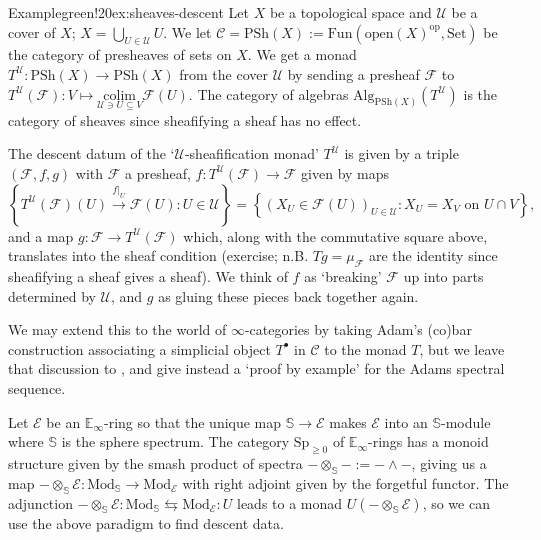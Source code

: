\begin{env}{Example}{green!20}{ex:sheaves-descent}
Let $X$ be a topological space and $\mathcal{U}$ be a cover of $X$; $X = \bigcup_{U \in \mathcal{U}} U$. We let $\mathcal{C} = \text{PSh}(X) := \text{Fun}(\text{open}(X)^\text{op},\text{Set})$ be the category of presheaves of sets on $X$. We get a monad $T^\mathcal{U} : \text{PSh}(X) \to \text{PSh}(X)$ from the cover $\mathcal{U}$ by sending a presheaf $\mathcal{F}$ to $T^\mathcal{U}(\mathcal{F}) : V \mapsto \underset{\mathcal{U} \ni U \subseteq V}{\text{colim}} \mathcal{F}(U)$. The category of algebras $\text{Alg}_{\text{PSh}(X)}(T^\mathcal{U})$ is the category of sheaves since sheafifying a sheaf has no effect.

The descent datum of the `$\mathcal{U}$-sheafification monad' $T^\mathcal{U}$ is given by a triple $(\mathcal{F}, f, g)$ with $\mathcal{F}$ a presheaf, $f : T^\mathcal{U}(\mathcal{F}) \to \mathcal{F}$ given by maps
	\[
	\left\{
	T^\mathcal{U}(\mathcal{F})(U)
	\overset{f|_U}{\to}
	\mathcal{F}(U)
	: U \in \mathcal{U}
	\right\}
	=
	\left\{
	(X_U \in \mathcal{F}(U))_{U\in\mathcal{U}}
	: X_U = X_V \text{ on } U \cap V
	\right\},
	\]
and a map $g : \mathcal{F} \to T^\mathcal{U}(\mathcal{F})$ which, along with the commutative square above, translates into the sheaf condition (exercise; n.B. $Tg = \mu_\mathcal{F}$ are the identity since sheafifying a sheaf gives a sheaf). We think of $f$ as `breaking' $\mathcal{F}$ up into parts determined by $\mathcal{U}$, and $g$ as gluing these pieces back together again.
\end{env}

We may extend this to the world of $\infty$-categories by taking Adam's (co)bar construction associating a simplicial object $T^\bullet$ in $\mathcal{C}$ to the monad $T$, but we leave that discussion to \cite{Hess18}, and give instead a `proof by example' for the Adams spectral sequence.



\newpage
Let $\mathcal{E}$ be an $\mathbb{E}_\infty$-ring so that the unique map $\mathbb{S} \to \mathcal{E}$ makes $\mathcal{E}$ into an $\mathbb{S}$-module where $\mathbb{S}$ is the sphere spectrum. The category $\text{Sp}_{\geq0}$ of $\mathbb{E}_\infty$-rings has a monoid structure given by the smash product of spectra $-\otimes_\mathbb{S} - := -\wedge-$, giving us a map $-\otimes_\mathbb{S} \mathcal{E} : \text{Mod}_\mathbb{S} \to \text{Mod}_\mathcal{E}$ with right adjoint given by the forgetful functor. The adjunction $-\otimes_\mathbb{S} \mathcal{E} : \text{Mod}_\mathbb{S} \leftrightarrows \text{Mod}_\mathcal{E} : U$ leads to a monad $U(-\otimes_\mathbb{S} \mathcal{E})$, so we can use the above paradigm to find descent data.

